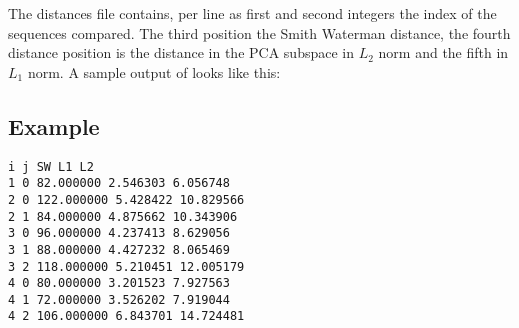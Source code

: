 The distances file contains, per line as first and second integers the
index of the sequences compared. The third position
the Smith Waterman distance, the fourth distance position is the
distance in the PCA subspace in $L_2$ norm and the fifth in $L_1$
norm.
A sample output of looks like this:
\subsection{Example}
\begin{lstlisting}
i j SW L1 L2
1 0 82.000000 2.546303 6.056748
2 0 122.000000 5.428422 10.829566
2 1 84.000000 4.875662 10.343906
3 0 96.000000 4.237413 8.629056
3 1 88.000000 4.427232 8.065469
3 2 118.000000 5.210451 12.005179
4 0 80.000000 3.201523 7.927563
4 1 72.000000 3.526202 7.919044
4 2 106.000000 6.843701 14.724481
\end{lstlisting}

